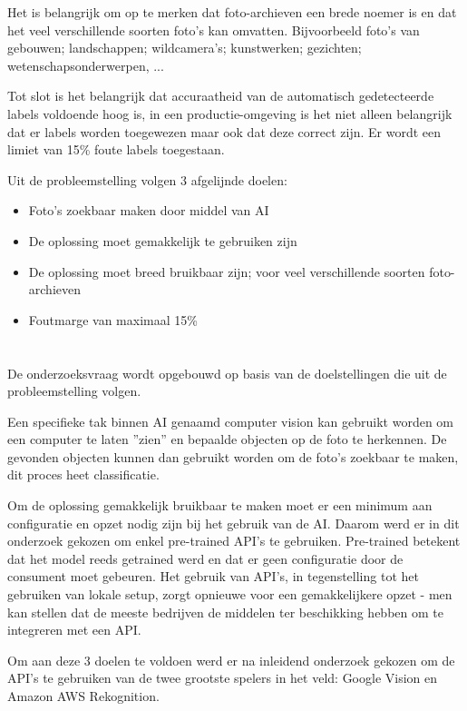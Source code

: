 Het is belangrijk om op te merken dat foto-archieven een brede noemer is en dat het veel verschillende soorten foto's kan omvatten. Bijvoorbeeld foto's van gebouwen; landschappen; wildcamera's; kunstwerken; gezichten; wetenschapsonderwerpen, ...

Tot slot is het belangrijk dat accuraatheid van de automatisch gedetecteerde labels voldoende hoog is,  in een productie-omgeving is het niet alleen belangrijk dat er labels worden toegewezen maar ook dat deze correct zijn. Er wordt een limiet van 15\% foute labels toegestaan.

Uit de probleemstelling volgen 3 afgelijnde doelen:
\begin{itemize}
    \item Foto's zoekbaar maken door middel van AI
    \item De oplossing moet gemakkelijk te gebruiken zijn
    \item De oplossing moet breed bruikbaar zijn; voor veel verschillende soorten foto-archieven
    \item Foutmarge van maximaal 15\%
\end{itemize}

\section{}
\label{sec:onderzoeksvraag}
De onderzoeksvraag wordt opgebouwd op basis van de doelstellingen die uit de probleemstelling volgen.

Een specifieke tak binnen AI genaamd computer vision kan gebruikt worden om een computer te laten ''zien'' en bepaalde objecten op de foto te herkennen. De gevonden objecten kunnen dan gebruikt worden om de foto's zoekbaar te maken, dit proces heet classificatie.

Om de oplossing gemakkelijk bruikbaar te maken moet er een minimum aan configuratie en opzet nodig zijn bij het gebruik van de AI. Daarom werd er in dit onderzoek gekozen om enkel pre-trained API's te gebruiken. Pre-trained betekent dat het model reeds getrained werd en dat er geen configuratie door de consument moet gebeuren. Het gebruik van API's, in tegenstelling tot het gebruiken van lokale setup, zorgt opnieuwe voor een gemakkelijkere opzet - men kan stellen dat de meeste bedrijven de middelen ter beschikking hebben om te integreren met een API.

Om aan deze 3 doelen te voldoen werd er na inleidend onderzoek gekozen om de API's te gebruiken van de twee grootste spelers in het veld: Google Vision en Amazon AWS Rekognition.

